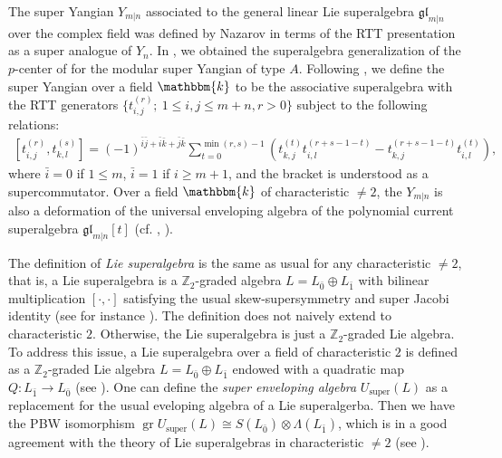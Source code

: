 \documentclass[12pt,reqno]{amsart}
\newcommand{\ZZ}{\mathbb{Z}}
\newcommand{\fgl}{\mathfrak{gl}}
\newcommand{\kk}{\mathbbm{k}}
\DeclareMathOperator{\super}{super}
\DeclareMathOperator{\gr}{gr}
\numberwithin{equation}{section}
\theoremstyle{Theorem}
\theoremstyle{remark}
\numberwithin{equation}{section}
\begin{document}
The super Yangian $Y_{m|n}$ associated to the general linear Lie superalgebra $\fgl_{m|n}$ over the complex field was defined by Nazarov \cite{Na91} in terms of the RTT presentation as a super analogue of $Y_n$. 
In \cite{CH23},
we obtained the superalgebra generalization of the $p$-center of \cite{BT18} for the modular super Yangian of type $A$.
Following \cite{Na91}, 
we define the super Yangian over a field $\kk$ to be the associative superalgebra with the RTT generators $\{t_{i,j}^{(r)};~1\leq i,j\leq m+n, r>0\}$
subject to the following relations:
\begin{align}\label{RTT relations for Ym|n}
\left[t_{i,j}^{(r)}, t_{k,l}^{(s)}\right]=(-1)^{\bar{i}\bar{j}+\bar i\bar k+\bar{j}\bar{k}}\sum_{t=0}^{\min(r,s)-1}
\left(t_{k, j}^{(t)} t_{i,l}^{(r+s-1-t)}-
t_{k,j}^{(r+s-1-t)}t_{i,l}^{(t)}\right),
\end{align}
where $\bar i=0$ if $1\leq m$, 
$\bar i=1$ if $i\geq m+1$,
and the bracket is understood as a supercommutator.
Over a field $\kk$ of characteristic $\neq 2$,
the $Y_{m|n}$ is also a deformation of the universal enveloping algebra of the polynomial current superalgebra $\fgl_{m|n}[t]$ (cf. \cite[Corollary 2]{Gow07}, \cite[Lemma 3.2]{CH23}).

The definition of {\it Lie superalgebra} is the same as usual for any characteristic $\neq 2$,
that is, a Lie superalgebra is a $\ZZ_2$-graded algebra $L=L_{\bar 0}\oplus L_{\bar 1}$ with bilinear multiplication $[\cdot,\cdot]$ satisfying the usual skew-supersymmetry and super Jacobi identity (see for instance \cite{Kac77}).
The definition does not naively extend to characteristic $2$.
Otherwise, the Lie superalgebra is just a $\ZZ_2$-graded Lie algebra.
To address this issue, 
a Lie superalgebra over a field of characteristic $2$ is defined as a $\ZZ_2$-graded Lie algebra $L=L_{\bar 0}\oplus L_{\bar 1}$ endowed with a quadratic map $Q:L_{\bar 1}\rightarrow L_{\bar 0}$ (see \cite{Bou+20, Bou+23}).
One can define the {\it super enveloping algebra} $U_{\super}(L)$ as a replacement for the usual eveloping algebra of a Lie superalgerba.
Then we have the PBW isomorphism $\gr U_{\super}(L)\cong S(L_{\bar 0})\otimes \Lambda(L_{\bar 1})$,
which is in a good agreement with the theory of Lie superalgebras in characteristic $\neq 2$ (see \cite{EH25}).
\end{document}
